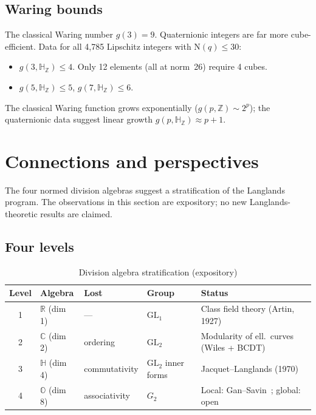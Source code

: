 \documentclass[11pt]{amsart}
\theoremstyle{plain}
\theoremstyle{definition}
\theoremstyle{remark}
\newcommand{\Z}{\mathbb{Z}}
\newcommand{\R}{\mathbb{R}}
\newcommand{\C}{\mathbb{C}}
\newcommand{\HH}{\mathbb{H}}
\newcommand{\OO}{\mathbb{O}}
\newcommand{\Norm}[1]{\mathrm{N}(#1)}
\newcommand{\GL}{\mathrm{GL}}
\begin{document}
\subsection{Waring bounds}

The classical Waring number $g(3) = 9$.
Quaternionic integers are far more cube-efficient.
Data for all 4{,}785 Lipschitz integers with $\Norm{q} \leq 30$:
\begin{itemize}
  \item $g(3, \HH_\Z) \leq 4$. Only 12 elements (all at norm~26) require 4 cubes.
  \item $g(5, \HH_\Z) \leq 5$, $g(7, \HH_\Z) \leq 6$.
\end{itemize}
The classical Waring function grows exponentially ($g(p, \Z) \sim 2^p$);
the quaternionic data suggest linear growth $g(p, \HH_\Z) \approx p + 1$.


\section{Connections and perspectives}\label{sec:langlands}

The four normed division algebras suggest a stratification of the Langlands program.
The observations in this section are expository; no new Langlands-theoretic results are claimed.

\subsection{Four levels}

\begin{table}[h]
\centering
\caption{Division algebra stratification (expository)}\label{tab:bridge}
\begin{tabular}{@{}cllll@{}}
  \toprule
  Level & Algebra & Lost & Group & Status \\
  \midrule
  1 & $\R$ (dim 1) & --- & $\GL_1$ & Class field theory (Artin, 1927) \\
  2 & $\C$ (dim 2) & ordering & $\GL_2$ & Modularity of ell.\ curves (Wiles + BCDT) \\
  3 & $\HH$ (dim 4) & commutativity & $\GL_2$ inner forms & Jacquet--Langlands (1970) \\
  4 & $\OO$ (dim 8) & associativity & $G_2$ & Local: Gan--Savin~\cite{GanSavin2023}; global: open \\
  \bottomrule
\end{tabular}
\end{table}
\end{document}
